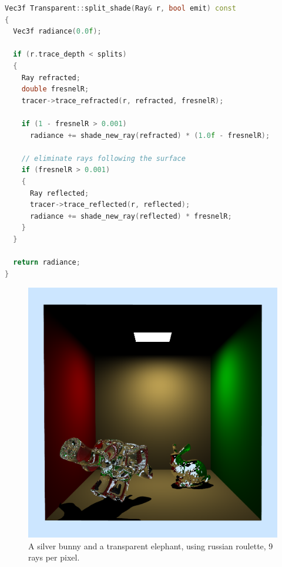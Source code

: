 \newpage
\begin{lstlisting}[language=C++,caption=Transparent::split\_shade,label=lst:transparent::split_shade]
Vec3f Transparent::split_shade(Ray& r, bool emit) const
{
  Vec3f radiance(0.0f);

  if (r.trace_depth < splits)
  {
    Ray refracted;
    double fresnelR;
    tracer->trace_refracted(r, refracted, fresnelR);

    if (1 - fresnelR > 0.001)
      radiance += shade_new_ray(refracted) * (1.0f - fresnelR);

    // eliminate rays following the surface
    if (fresnelR > 0.001)
    {
      Ray reflected;
      tracer->trace_reflected(r, reflected);
      radiance += shade_new_ray(reflected) * fresnelR;
    }
  }

  return radiance;
}
\end{lstlisting}

\begin{figure}[h]
	\centering
	
	\includegraphics[width=\textwidth]{week3/bunny_el_9rpp.png}
	
	\caption{A silver bunny and a transparent elephant, using russian roulette, 9 rays per pixel.}
	\label{fig:bunnyelephant.png}
\end{figure}